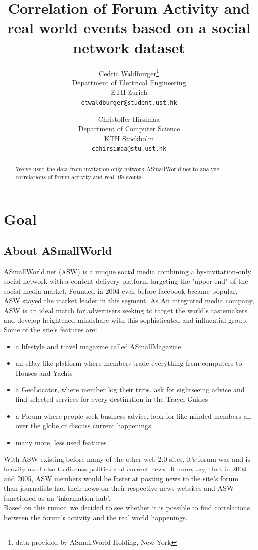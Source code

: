 \documentclass[11pt,a4paper,english]{article}
\title{Correlation of Forum Activity and real world events based on a social network dataset}
\author{%
  Cedric Waldburger\thanks{data provided by ASmallWorld Holding, New York}\\
  \small Department of Electrical Engineering\\
  \small ETH Zurich \\
  \small\texttt{ctwaldburger@student.ust.hk}
  \and
  Christoffer Hirsimaa\\
  \small Department of Computer Science\\
  \small KTH Stockholm\\
  \small\texttt{cahirsimaa@stu.ust.hk}
}
\begin{document}
  \maketitle

  \begin{abstract}
    We've used the data from invitation-only network ASmallWorld.net to analyze correlations of forum activity and real life events.
  \end{abstract}
  \newpage

  \tableofcontents\newpage

	\section{Goal}
		\subsection{About ASmallWorld}
			ASmallWorld.net (ASW) is a unique social media combining a by-invitation-only social network with a content delivery platform targeting the "upper end" of the social media market. Founded in 2004 even before facebook became popular, ASW stayed the market leader in this segment. As An integrated media company, ASW is an ideal match for advertisers seeking to target the world's tastemakers and develop heightened mindshare with this sophisticated and influential group.
			\\Some of the site's features are: \begin{itemize}
				\item a lifestyle and travel magazine called ASmallMagazine
				\item an eBay-like platform where members trade everything from computers to Houses and Yachts
				\item a GeoLocator, where member log their trips, ask for sightseeing advice and find selected services for every destination in the Travel Guides
				\item a Forum where people seek business advice, look for like-minded members all over the globe or discuss current happenings
				\item many more, less used features
			\end{itemize}
			With ASW existing before many of the other web 2.0 sites, it's forum was and is heavily used also to discuss politics and current news. Rumors say, that in 2004 and 2005, ASW members would be faster at posting news to the site's forum than journalists had their news on their respective news websites and ASW functioned as an 'information hub'.
			\\ Based on this rumor, we decided to see whether it is possible to find correlations between the forum's activity and the real world happenings.
			
\end{document}
